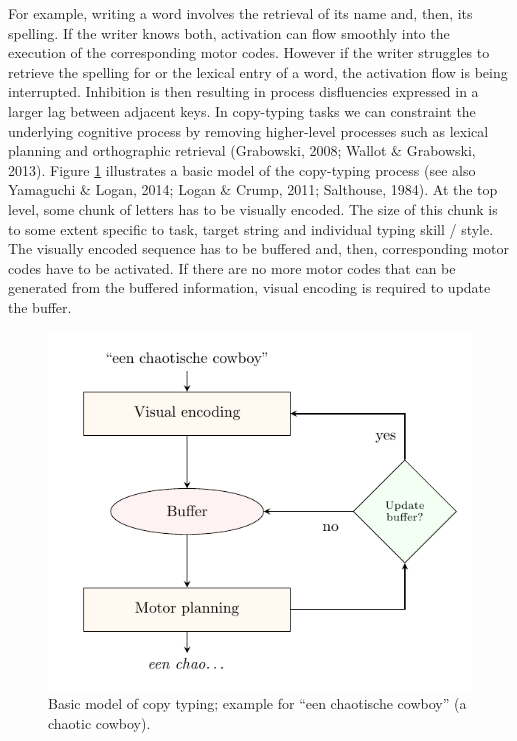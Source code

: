 \documentclass[
  english,
  man,mask,floatsintext]{apa7}
\begin{document}
For example, writing a word involves the retrieval of its name and, then, its spelling. If the writer knows both, activation can flow smoothly into the execution of the corresponding motor codes. However if the writer struggles to retrieve the spelling for or the lexical entry of a word, the activation flow is being interrupted. Inhibition is then resulting in process disfluencies expressed in a larger lag between adjacent keys. In copy-typing tasks we can constraint the underlying cognitive process by removing higher-level processes such as lexical planning and orthographic retrieval (Grabowski, 2008; Wallot \& Grabowski, 2013). Figure \ref{fig:model} illustrates a basic model of the copy-typing process (see also Yamaguchi \& Logan, 2014; Logan \& Crump, 2011; Salthouse, 1984). At the top level, some chunk of letters has to be visually encoded. The size of this chunk is to some extent specific to task, target string and individual typing skill / style. The visually encoded sequence has to be buffered and, then, corresponding motor codes have to be activated. If there are no more motor codes that can be generated from the buffered information, visual encoding is required to update the buffer.

\begin{figure}[bp!]

{\centering \includegraphics{spelling_decision} 

}

\caption{Basic model of copy typing; example for ``een chaotische cowboy'' (a chaotic cowboy).}\label{fig:model}
\end{figure}
\end{document}

